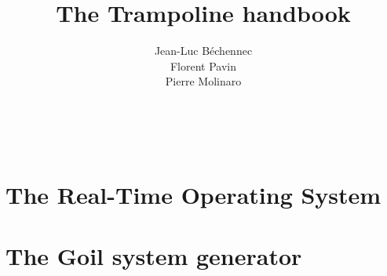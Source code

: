 \documentclass[11pt]{manual}
\title{The Trampoline handbook}
\author{Jean-Luc B\'echennec\\Florent Pavin\\Pierre Molinaro}
\begin{document}
\maketitle
~\newpage
\setcounter{tocdepth}{2}
\tableofcontents

\part{The Real-Time Operating System}








\part{The Goil system generator}



\printindex



 
\end{document}
